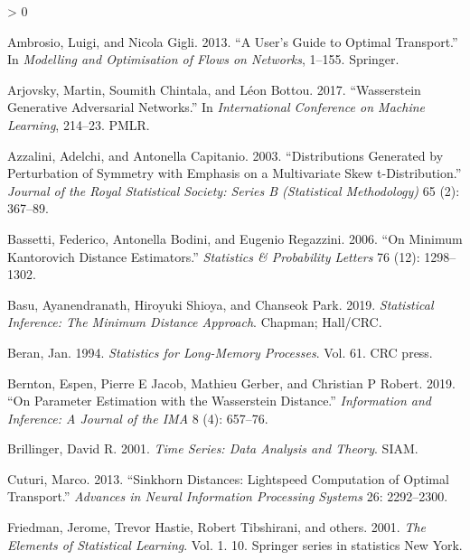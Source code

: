 \documentclass[
  11pt,
]{article}
\newlength{\cslhangindent}
\newenvironment{CSLReferences}[2] %
 {%
  \setlength{\parindent}{0pt}
  \ifodd #1 \everypar{\setlength{\hangindent}{\cslhangindent}}\ignorespaces\fi
  \ifnum #2 > 0
  \setlength{\parskip}{#2\baselineskip}
  \fi
 }%
 {}
\begin{document}
\hypertarget{refs}{}
\begin{CSLReferences}{1}{0}
\leavevmode\hypertarget{ref-ambrosio2013user}{}%
Ambrosio, Luigi, and Nicola Gigli. 2013. {``A User's Guide to Optimal
Transport.''} In \emph{Modelling and Optimisation of Flows on Networks},
1--155. Springer.

\leavevmode\hypertarget{ref-arjovsky2017wasserstein}{}%
Arjovsky, Martin, Soumith Chintala, and Léon Bottou. 2017.
{``Wasserstein Generative Adversarial Networks.''} In
\emph{International Conference on Machine Learning}, 214--23. PMLR.

\leavevmode\hypertarget{ref-azzalini2003distributions}{}%
Azzalini, Adelchi, and Antonella Capitanio. 2003. {``Distributions
Generated by Perturbation of Symmetry with Emphasis on a Multivariate
Skew t-Distribution.''} \emph{Journal of the Royal Statistical Society:
Series B (Statistical Methodology)} 65 (2): 367--89.

\leavevmode\hypertarget{ref-bassetti2006minimum}{}%
Bassetti, Federico, Antonella Bodini, and Eugenio Regazzini. 2006. {``On
Minimum Kantorovich Distance Estimators.''} \emph{Statistics \&
Probability Letters} 76 (12): 1298--1302.

\leavevmode\hypertarget{ref-basu2019statistical}{}%
Basu, Ayanendranath, Hiroyuki Shioya, and Chanseok Park. 2019.
\emph{Statistical Inference: The Minimum Distance Approach}. Chapman;
Hall/CRC.

\leavevmode\hypertarget{ref-beran1994statistics}{}%
Beran, Jan. 1994. \emph{Statistics for Long-Memory Processes}. Vol. 61.
CRC press.

\leavevmode\hypertarget{ref-bernton2019parameter}{}%
Bernton, Espen, Pierre E Jacob, Mathieu Gerber, and Christian P Robert.
2019. {``On Parameter Estimation with the Wasserstein Distance.''}
\emph{Information and Inference: A Journal of the IMA} 8 (4): 657--76.

\leavevmode\hypertarget{ref-brillinger2001time}{}%
Brillinger, David R. 2001. \emph{Time Series: Data Analysis and Theory}.
SIAM.

\leavevmode\hypertarget{ref-cuturi2013sinkhorn}{}%
Cuturi, Marco. 2013. {``Sinkhorn Distances: Lightspeed Computation of
Optimal Transport.''} \emph{Advances in Neural Information Processing
Systems} 26: 2292--2300.

\leavevmode\hypertarget{ref-friedman2001elements}{}%
Friedman, Jerome, Trevor Hastie, Robert Tibshirani, and others. 2001.
\emph{The Elements of Statistical Learning}. Vol. 1. 10. Springer series
in statistics New York.


\end{CSLReferences}
\end{document}
